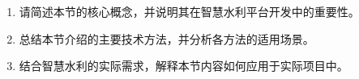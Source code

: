 {\begin{enumerate} \def\labelenumi{\arabic{enumi}.} \item 请简述本节的核心概念，并说明其在智慧水利平台开发中的重要性。 \item 总结本节介绍的主要技术方法，并分析各方法的适用场景。 \item 结合智慧水利的实际需求，解释本节内容如何应用于实际项目中。 \end{enumerate} \hypertarget{ux63d0ux9ad8ux9898}{%

}}
